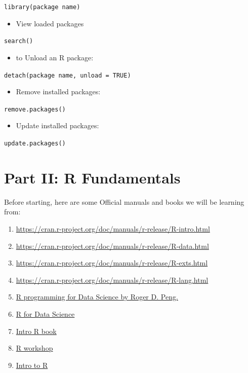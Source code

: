 \documentclass[
]{book}
\providecommand{\tightlist}{%
  \setlength{\itemsep}{0pt}\setlength{\parskip}{0pt}}
\begin{document}
\texttt{library(package\ name)}

\begin{itemize}
\tightlist
\item
  View loaded packages
\end{itemize}

\texttt{search()}

\begin{itemize}
\tightlist
\item
  to Unload an R package:
\end{itemize}

\texttt{detach(package\ name,\ unload\ =\ TRUE)}

\begin{itemize}
\tightlist
\item
  Remove installed packages:
\end{itemize}

\texttt{remove.packages()}

\begin{itemize}
\tightlist
\item
  Update installed packages:
\end{itemize}

\texttt{update.packages()}

\chapter*{Part II: R Fundamentals}\label{part-ii-r-fundamentals}

Before starting, here are some Official manuals and books we will be learning from:

\begin{enumerate}
\def\labelenumi{\arabic{enumi}.}
\tightlist
\item
  \url{https://cran.r-project.org/doc/manuals/r-release/R-intro.html} \citep{RIntro}
\item
  \url{https://cran.r-project.org/doc/manuals/r-release/R-data.html} \citep{RData}
\item
  \url{https://cran.r-project.org/doc/manuals/r-release/R-exts.html} \citep{RExts}
\item
  \url{https://cran.r-project.org/doc/manuals/r-release/R-lang.html} \citep{RLang}
\item
  \href{https://bookdown.org/rdpeng/rprogdatascience/}{R programming for Data Science by Roger D. Peng.} \citep{Peng2024}
\item
  \href{https://r4ds.had.co.nz/}{R for Data Science} \citep{WickhamHadley2024}
\item
  \href{https://katrienantonio.github.io/intro-R-book/}{Intro R book} \citep{Antonio2020}
\item
  \href{https://unl-statistics.github.io/R-workshops/}{R workshop} \citep{UNLWorkshops}
\item
  \href{https://intro2r.com/}{Intro to R} \citep{Intro2R2024}
\end{enumerate}
\end{document}
